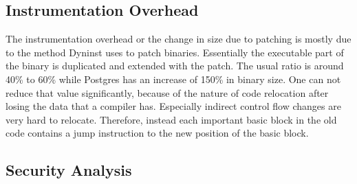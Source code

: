 
\subsection{Instrumentation Overhead}
\label{section:typeshieldoverheadinstrumentation}


The instrumentation overhead or the change in size due to patching is mostly due to the method Dyninst uses to patch binaries. 
Essentially the executable part of the binary is duplicated and extended with the patch. The usual ratio is around 40\% to 
60\% while Postgres has an increase of 150\% in binary size. One can not reduce that value significantly, 
because of the nature of code relocation after losing the data that a compiler has. Especially indirect control flow 
changes are very hard to relocate. Therefore, instead each important basic block in the old code contains a jump 
instruction to the new position of the basic block.

\subsection{Security Analysis}
\label{RQ5: Security Analysis}

